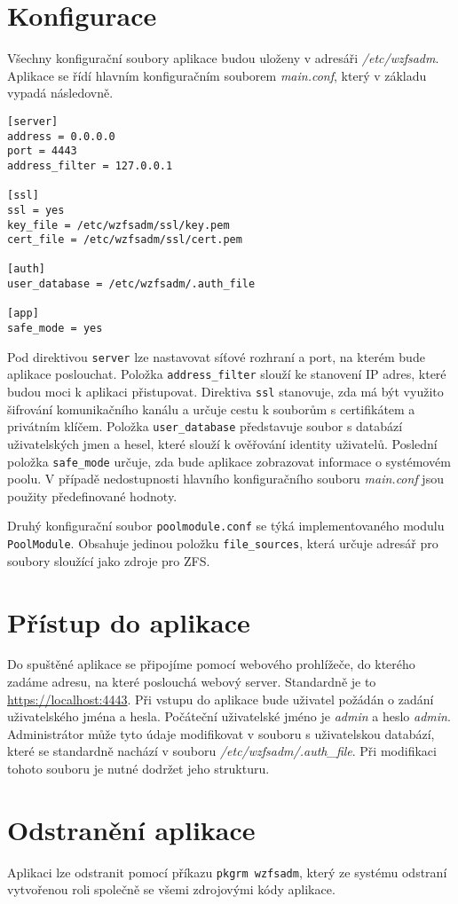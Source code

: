 \section{Konfigurace}
Všechny konfigurační soubory aplikace budou uloženy v adresáři \emph{/etc/wzfsadm}. Aplikace se řídí hlavním konfiguračním souborem \emph{main.conf}, který v základu vypadá následovně.
\begin{verbatim}
[server]
address = 0.0.0.0
port = 4443
address_filter = 127.0.0.1

[ssl]
ssl = yes
key_file = /etc/wzfsadm/ssl/key.pem
cert_file = /etc/wzfsadm/ssl/cert.pem

[auth]
user_database = /etc/wzfsadm/.auth_file

[app]
safe_mode = yes
\end{verbatim}
Pod direktivou \verb|server| lze nastavovat síťové rozhraní a port, na kterém bude aplikace poslouchat. Položka \verb|address_filter| slouží ke stanovení IP adres, které budou moci k aplikaci přistupovat. Direktiva \verb|ssl| stanovuje, zda má být využito šifrování komunikačního kanálu a určuje cestu k souborům s certifikátem a privátním klíčem. Položka \verb|user_database| představuje soubor s databází uživatelských jmen a hesel, které slouží k ověřování identity uživatelů. Poslední položka \verb|safe_mode| určuje, zda bude aplikace zobrazovat informace o systémovém poolu. V případě nedostupnosti hlavního konfiguračního souboru \emph{main.conf} jsou použity předefinované hodnoty.

Druhý konfigurační soubor \verb|poolmodule.conf| se týká implementovaného modulu \verb|PoolModule|. Obsahuje jedinou položku \verb|file_sources|, která určuje adresář pro soubory sloužící jako zdroje pro ZFS.

\section{Přístup do aplikace}
Do spuštěné aplikace se připojíme pomocí webového prohlížeče, do kterého zadáme adresu, na které poslouchá webový server. Standardně je to \url{https://localhost:4443}. Při vstupu do aplikace bude uživatel požádán o zadání uživatelského jména a hesla. Počáteční uživatelské jméno je \emph{admin} a heslo \emph{admin}. Administrátor může tyto údaje modifikovat v souboru s uživatelskou databází, které se standardně nachází v souboru \emph{/etc/wzfsadm/.auth\_file}. Při modifikaci tohoto souboru je nutné dodržet jeho strukturu.

\section{Odstranění aplikace}
Aplikaci lze odstranit pomocí příkazu \verb|pkgrm wzfsadm|, který ze systému odstraní vytvořenou roli společně se všemi zdrojovými kódy aplikace. 